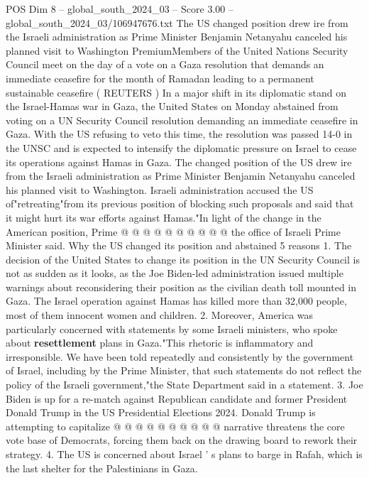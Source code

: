 \begin{textsample}{POS Dim 8 – global\_south\_2024\_03 – Score 3.00 – global\_south\_2024\_03/106947676.txt}  \label{ex:f8_pos_423}
The US changed position drew ire from the Israeli administration as Prime Minister Benjamin Netanyahu canceled his planned visit to Washington PremiumMembers of the United Nations Security Council meet on the day of a vote on a Gaza resolution that demands an immediate ceasefire for the month of Ramadan leading to a permanent sustainable ceasefire ( REUTERS ) In a major shift in its diplomatic stand on the Israel-Hamas war in Gaza, the United States on Monday abstained from voting on a UN Security Council resolution demanding an immediate ceasefire in Gaza.
With the US refusing to veto this time, the resolution was passed 14-0 in the UNSC and is expected to intensify the diplomatic pressure on Israel to cease its operations against Hamas in Gaza.
The changed position of the US drew ire from the Israeli administration as Prime Minister Benjamin Netanyahu canceled his planned visit to Washington.
Israeli administration accused the US of"retreating"from its previous position of blocking such proposals and said that it might hurt its war efforts against Hamas."In light of the change in the American position, Prime @ @ @ @ @ @ @ @ @ @ the office of Israeli Prime Minister said.
Why the US changed its position and abstained 5 reasons 1.
The decision of the United States to change its position in the UN Security Council is not as sudden as it looks, as the Joe Biden-led administration issued multiple warnings about reconsidering their position as the civilian death toll mounted in Gaza.
The Israel operation against Hamas has killed more than 32,000 people, most of them innocent women and children. 2.
Moreover, America was particularly concerned with statements by some Israeli ministers, who spoke about \textbf{resettlement} plans in Gaza."This rhetoric is inflammatory and irresponsible.
We have been told repeatedly and consistently by the government of Israel, including by the Prime Minister, that such statements do not reflect the policy of the Israeli government,"the State Department said in a statement. 3.
Joe Biden is up for a re-match against Republican candidate and former President Donald Trump in the US Presidential Elections 2024.
Donald Trump is attempting to capitalize @ @ @ @ @ @ @ @ @ @ narrative threatens the core vote base of Democrats, forcing them back on the drawing board to rework their strategy. 4.
The US is concerned about Israel ' s plans to barge in Rafah, which is the last shelter for the Palestinians in Gaza.

\end{textsample}
